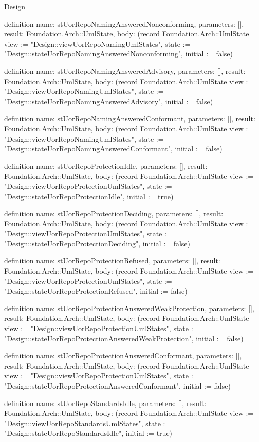 \begin{lexlean}{Design}
\begin{semanticmodule}
definition{
  name: stUorRepoNamingAnsweredNonconforming,
  parameters: [],
  result: Foundation.Arch::UmlState,
  body: (record Foundation.Arch::UmlState {view := "Design::viewUorRepoNamingUmlStates", state := "Design::stateUorRepoNamingAnsweredNonconforming", initial := false})
}

definition{
  name: stUorRepoNamingAnsweredAdvisory,
  parameters: [],
  result: Foundation.Arch::UmlState,
  body: (record Foundation.Arch::UmlState {view := "Design::viewUorRepoNamingUmlStates", state := "Design::stateUorRepoNamingAnsweredAdvisory", initial := false})
}

definition{
  name: stUorRepoNamingAnsweredConformant,
  parameters: [],
  result: Foundation.Arch::UmlState,
  body: (record Foundation.Arch::UmlState {view := "Design::viewUorRepoNamingUmlStates", state := "Design::stateUorRepoNamingAnsweredConformant", initial := false})
}

definition{
  name: stUorRepoProtectionIdle,
  parameters: [],
  result: Foundation.Arch::UmlState,
  body: (record Foundation.Arch::UmlState {view := "Design::viewUorRepoProtectionUmlStates", state := "Design::stateUorRepoProtectionIdle", initial := true})
}

definition{
  name: stUorRepoProtectionDeciding,
  parameters: [],
  result: Foundation.Arch::UmlState,
  body: (record Foundation.Arch::UmlState {view := "Design::viewUorRepoProtectionUmlStates", state := "Design::stateUorRepoProtectionDeciding", initial := false})
}

definition{
  name: stUorRepoProtectionRefused,
  parameters: [],
  result: Foundation.Arch::UmlState,
  body: (record Foundation.Arch::UmlState {view := "Design::viewUorRepoProtectionUmlStates", state := "Design::stateUorRepoProtectionRefused", initial := false})
}

definition{
  name: stUorRepoProtectionAnsweredWeakProtection,
  parameters: [],
  result: Foundation.Arch::UmlState,
  body: (record Foundation.Arch::UmlState {view := "Design::viewUorRepoProtectionUmlStates", state := "Design::stateUorRepoProtectionAnsweredWeakProtection", initial := false})
}

definition{
  name: stUorRepoProtectionAnsweredConformant,
  parameters: [],
  result: Foundation.Arch::UmlState,
  body: (record Foundation.Arch::UmlState {view := "Design::viewUorRepoProtectionUmlStates", state := "Design::stateUorRepoProtectionAnsweredConformant", initial := false})
}

definition{
  name: stUorRepoStandardsIdle,
  parameters: [],
  result: Foundation.Arch::UmlState,
  body: (record Foundation.Arch::UmlState {view := "Design::viewUorRepoStandardsUmlStates", state := "Design::stateUorRepoStandardsIdle", initial := true})
}


\end{semanticmodule}
\end{lexlean}
